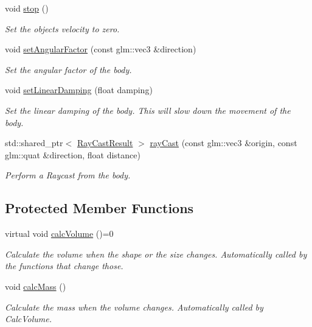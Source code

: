 \begin{DoxyCompactItemize}
\mbox{\label{classTarbora_1_1RigidBody_a73a0ee3f89b0d221da433d0a3b102a63}} 
void \hyperlink{classTarbora_1_1RigidBody_a73a0ee3f89b0d221da433d0a3b102a63}{stop} ()
\begin{DoxyCompactList}\small\item\em Set the object\textquotesingle{}s velocity to zero. \end{DoxyCompactList}\item 
void \hyperlink{classTarbora_1_1RigidBody_a2cc6295e8f2a6c9eaf88c037ee32aa4f}{set\+Angular\+Factor} (const glm\+::vec3 \&direction)
\begin{DoxyCompactList}\small\item\em Set the angular factor of the body. \end{DoxyCompactList}\item 
void \hyperlink{classTarbora_1_1RigidBody_ae1ccef4eb62dd20d709e28ff012bff84}{set\+Linear\+Damping} (float damping)
\begin{DoxyCompactList}\small\item\em Set the linear damping of the body. This will slow down the movement of the body. \end{DoxyCompactList}\item 
std\+::shared\+\_\+ptr$<$ \hyperlink{structTarbora_1_1RayCastResult}{Ray\+Cast\+Result} $>$ \hyperlink{classTarbora_1_1RigidBody_ab0ea04e6929334288ba061767c9ad141}{ray\+Cast} (const glm\+::vec3 \&origin, const glm\+::quat \&direction, float distance)
\begin{DoxyCompactList}\small\item\em Perform a Raycast from the body. \end{DoxyCompactList}\end{DoxyCompactItemize}
\subsection*{Protected Member Functions}
\begin{DoxyCompactItemize}
\item 
\mbox{\label{classTarbora_1_1RigidBody_a5d97acef2ff4067bd2261dd1a05badad}} 
virtual void \hyperlink{classTarbora_1_1RigidBody_a5d97acef2ff4067bd2261dd1a05badad}{calc\+Volume} ()=0
\begin{DoxyCompactList}\small\item\em Calculate the volume when the shape or the size changes. Automatically called by the functions that change those. \end{DoxyCompactList}\item 
\mbox{\label{classTarbora_1_1RigidBody_afa38ef0ea477b4ad94dae47d36b4bb5f}} 
void \hyperlink{classTarbora_1_1RigidBody_afa38ef0ea477b4ad94dae47d36b4bb5f}{calc\+Mass} ()
\begin{DoxyCompactList}\small\item\em Calculate the mass when the volume changes. Automatically called by Calc\+Volume. \end{DoxyCompactList}\end{DoxyCompactItemize}
